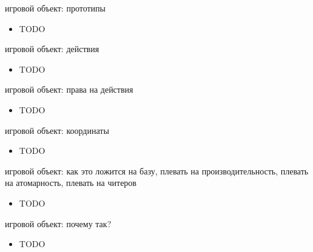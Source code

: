 \documentclass[aspectratio=169,handout,bigger]{beamer}
\begin{document}

\begin{frame}{игровой объект: прототипы}
  \begin{itemize}
    \item TODO
  \end{itemize}
\end{frame}


\begin{frame}{игровой объект: действия}
  \begin{itemize}
    \item TODO
  \end{itemize}
\end{frame}


\begin{frame}{игровой объект: права на действия}
  \begin{itemize}
    \item TODO
  \end{itemize}
\end{frame}


\begin{frame}{игровой объект: координаты}
  \begin{itemize}
    \item TODO
  \end{itemize}
\end{frame}


\begin{frame}{игровой объект: как это ложится на базу, плевать на производительность, плевать на атомарность, плевать на читеров}
  \begin{itemize}
    \item TODO
  \end{itemize}
\end{frame}


\begin{frame}{игровой объект: почему так?}
  \begin{itemize}
    \item TODO
  \end{itemize}
\end{frame}
\end{document}
